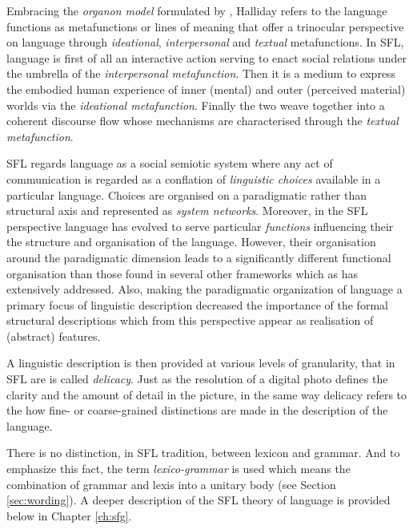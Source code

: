 
Embracing the \textit{organon model} formulated by \citet{Buhler34}, Halliday refers to the language functions as metafunctions or lines of meaning that offer a trinocular perspective on language through \textit{ideational}, \textit{interpersonal} and \textit{textual} metafunctions. In SFL, language is first of all an interactive action serving to enact social relations under the umbrella of the \textit{interpersonal metafunction}. Then it is a medium to express the embodied human experience of inner (mental) and outer (perceived material) worlds via the \textit{ideational metafunction}. Finally the two weave together into a coherent discourse flow whose mechanisms are characterised through the \textit{textual metafunction}. 

SFL regards language as a social semiotic system where any act of communication is regarded as a conflation of \textit{linguistic choices} available in a particular language. Choices are organised on a paradigmatic rather than structural axis and represented as \textit{system networks}. Moreover, in the SFL perspective language has evolved to serve particular \textit{functions} influencing their the structure and organisation of the language. However, their organisation around the paradigmatic dimension leads to a significantly different functional organisation than those found in several other frameworks which as \citet{Butler2003-pt1, Butler2003-pt2} has extensively addressed. 
Also, making the paradigmatic organization of language a primary focus of linguistic description decreased the importance of the formal structural descriptions which from this perspective appear as realisation of (abstract) features. 

A linguistic description is then provided at various levels of granularity, that in SFL are is called \textit{delicacy}. Just as the resolution of a digital photo defines the clarity and the amount of detail in the picture, in the same way delicacy refers to the how fine- or coarse-grained distinctions are made in the description of the language. 

There is no distinction, in SFL tradition, between lexicon and grammar. And to emphasize this fact, the term \textit{lexico-grammar} is used which means the combination of grammar and lexis into a unitary body (see Section \ref{sec:wording}).%
A deeper description of the SFL theory of language is provided below in Chapter \ref{ch:sfg}.

